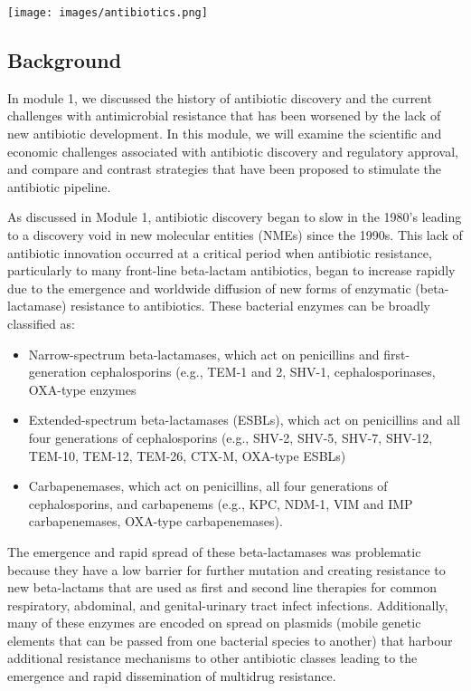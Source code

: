 \documentclass[
  11pt,
  paper=a4,
  ,captions=tableheading
]{scrartcl}
\providecommand{\tightlist}{%
  \setlength{\itemsep}{0pt}\setlength{\parskip}{0pt}}
\begin{document}
\texttt{[image: images/antibiotics.png]}

\hypertarget{background}{%
\subsection*{Background}\label{background}}

In module 1, we discussed the history of antibiotic discovery and the
current challenges with antimicrobial resistance that has been worsened
by the lack of new antibiotic development. In this module, we will
examine the scientific and economic challenges associated with
antibiotic discovery and regulatory approval, and compare and contrast
strategies that have been proposed to stimulate the antibiotic pipeline.

As discussed in Module 1, antibiotic discovery began to slow in the
1980's leading to a discovery void in new molecular entities (NMEs)
since the 1990s. This lack of antibiotic innovation occurred at a
critical period when antibiotic resistance, particularly to many
front-line beta-lactam antibiotics, began to increase rapidly due to the
emergence and worldwide diffusion of new forms of enzymatic
(beta-lactamase) resistance to antibiotics. These bacterial enzymes can
be broadly classified as:

\begin{itemize}
\tightlist
\item
  Narrow-spectrum beta-lactamases, which act on penicillins and
  first-generation cephalosporins (e.g., TEM-1 and 2, SHV-1,
  cephalosporinases, OXA-type enzymes
\item
  Extended-spectrum beta-lactamases (ESBLs), which act on penicillins
  and all four generations of cephalosporins (e.g., SHV-2, SHV-5, SHV-7,
  SHV-12, TEM-10, TEM-12, TEM-26, CTX-M, OXA-type ESBLs)
\item
  Carbapenemases, which act on penicillins, all four generations of
  cephalosporins, and carbapenems (e.g., KPC, NDM-1, VIM and IMP
  carbapenemases, OXA-type carbapenemases).
\end{itemize}

The emergence and rapid spread of these beta-lactamases was problematic
because they have a low barrier for further mutation and creating
resistance to new beta-lactams that are used as first and second line
therapies for common respiratory, abdominal, and genital-urinary tract
infect infections. Additionally, many of these enzymes are encoded on
spread on plasmids (mobile genetic elements that can be passed from one
bacterial species to another) that harbour additional resistance
mechanisms to other antibiotic classes leading to the emergence and
rapid dissemination of multidrug resistance.
\end{document}
